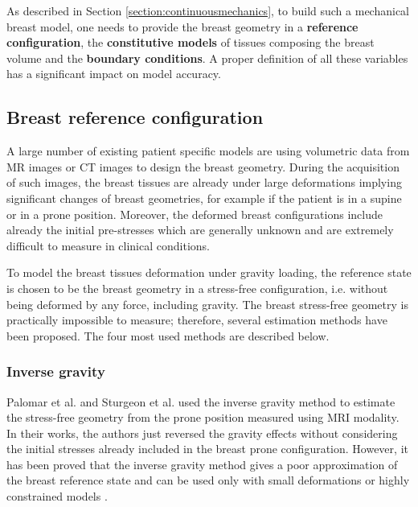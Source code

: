  
As described in Section \ref{section:continuousmechanics}, to build such a mechanical breast model, one needs to provide the breast geometry in a \textbf{reference configuration}, the \textbf{constitutive models} of tissues composing the breast volume and the \textbf{boundary conditions}. A proper definition of all these variables has a significant impact on model accuracy.

\subsection{Breast reference configuration} 

A large number of existing patient specific models are using volumetric data from MR images \citep{carter_biomechanical_2009,kellner_simulation_2007, conley_realization_2015, eiben_symmetric_2016, martinez_finite_2017}  or CT images \citep{palomar_finite_2008, sturgeon_finite_element_2016} to design the breast geometry. During the acquisition of such images, the breast tissues are already under large deformations implying significant changes of breast geometries, for example if the patient is in a supine or in a prone position. Moreover, the deformed breast configurations include already the initial pre-stresses which are generally unknown and are extremely difficult to measure in clinical conditions. 
 

To model the breast tissues deformation under gravity loading, the reference state is chosen to be the breast geometry in a stress-free configuration, i.e. without being deformed by any force, including gravity. The breast stress-free geometry is practically impossible to measure; therefore, several estimation methods have been proposed. The four most used methods are described below.

 
 
  \subsubsection*{Inverse gravity}\label{subsubsection:inversegravity}
Palomar et al. \citep{palomar_finite_2008} and Sturgeon et al. \citep{ sturgeon_finite_element_2016} used the inverse gravity method to estimate the stress-free geometry from the prone position measured using MRI modality. In their works, the authors just reversed the gravity effects without considering the initial stresses already included in the breast prone configuration. However, it has been proved that the inverse gravity method gives a poor approximation of the breast reference state and can be used only with small deformations or highly constrained models \citep{eiben_breast_2014}.  

